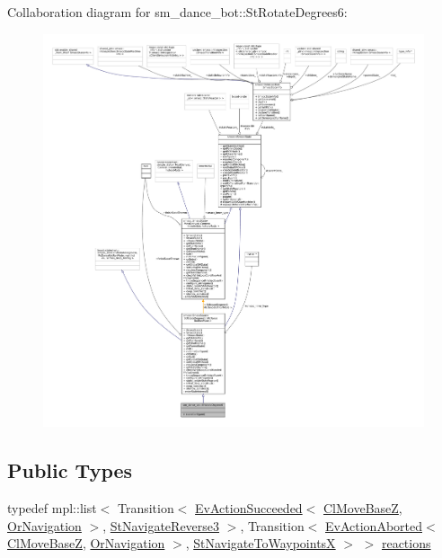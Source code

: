 Collaboration diagram for sm\+\_\+dance\+\_\+bot\+:\+:St\+Rotate\+Degrees6\+:
\nopagebreak
\begin{figure}[H]
\begin{center}
\leavevmode
\includegraphics[width=350pt]{structsm__dance__bot_1_1StRotateDegrees6__coll__graph}
\end{center}
\end{figure}
\subsection*{Public Types}
\begin{DoxyCompactItemize}
\item 
typedef mpl\+::list$<$ Transition$<$ \hyperlink{structsmacc_1_1default__events_1_1EvActionSucceeded}{Ev\+Action\+Succeeded}$<$ \hyperlink{classcl__move__base__z_1_1ClMoveBaseZ}{Cl\+Move\+BaseZ}, \hyperlink{classsm__dance__bot_1_1OrNavigation}{Or\+Navigation} $>$, \hyperlink{structsm__dance__bot_1_1StNavigateReverse3}{St\+Navigate\+Reverse3} $>$, Transition$<$ \hyperlink{structsmacc_1_1default__events_1_1EvActionAborted}{Ev\+Action\+Aborted}$<$ \hyperlink{classcl__move__base__z_1_1ClMoveBaseZ}{Cl\+Move\+BaseZ}, \hyperlink{classsm__dance__bot_1_1OrNavigation}{Or\+Navigation} $>$, \hyperlink{structsm__dance__bot_1_1StNavigateToWaypointsX}{St\+Navigate\+To\+WaypointsX} $>$ $>$ \hyperlink{structsm__dance__bot_1_1StRotateDegrees6_a6f12012f35d4f854115f900ea511d75d}{reactions}
\end{DoxyCompactItemize}
